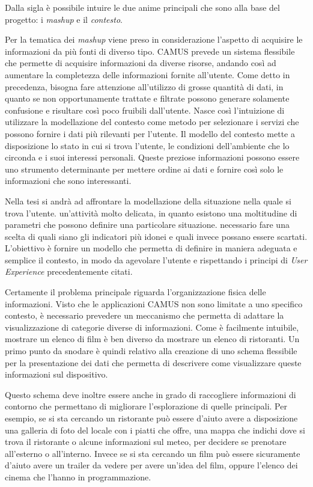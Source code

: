 Dalla sigla è possibile intuire le due anime principali che sono alla base del progetto: i \emph{mashup} e il \emph{contesto}.

Per la tematica dei \emph{mashup} viene preso in considerazione l'aspetto di acquisire le informazioni da più fonti di diverso tipo. CAMUS prevede un sistema flessibile che permette di acquisire informazioni da diverse risorse, andando così ad aumentare la completezza delle informazioni fornite all'utente. Come detto in precedenza, bisogna fare attenzione all'utilizzo di grosse quantità di dati, in quanto se non opportunamente trattate e filtrate possono generare solamente confusione e risultare così poco fruibili dall'utente. Nasce così l'intuizione di utilizzare la modellazione del contesto come metodo per selezionare i servizi che possono fornire i dati più rilevanti per l'utente. Il modello del contesto mette a disposizione lo stato in cui si trova l'utente, le condizioni dell'ambiente che lo circonda e i suoi interessi personali. Queste preziose informazioni possono essere uno strumento determinante per mettere ordine ai dati e fornire così solo le informazioni che sono interessanti.

Nella tesi si andrà ad affrontare la modellazione della situazione nella quale si trova l'utente. \upe un'attività molto delicata, in quanto esistono una moltitudine di parametri che possono definire una particolare situazione. \upe necessario fare una scelta di quali siano gli indicatori più idonei e quali invece possano essere scartati. L'obiettivo è fornire un modello che permetta di definire in maniera adeguata e semplice il contesto, in modo da agevolare l'utente e rispettando i principi di \emph{User Experience} precedentemente citati.

Certamente il problema principale riguarda l'organizzazione fisica delle informazioni. Visto che le applicazioni CAMUS non sono limitate a uno specifico contesto, è necessario prevedere un meccanismo che permetta di adattare la visualizzazione di categorie diverse di informazioni. Come è facilmente intuibile, mostrare un elenco di film è ben diverso da mostrare un elenco di ristoranti. Un primo punto da snodare è quindi relativo alla creazione di uno schema flessibile per la presentazione dei dati che permetta di descrivere come visualizzare queste informazioni sul dispositivo.

Questo schema deve inoltre essere anche in grado di raccogliere informazioni di contorno che permettano di migliorare l'esplorazione di quelle principali. Per esempio, se si sta cercando un ristorante può essere d'aiuto avere a disposizione una galleria di foto del locale con i piatti che offre, una mappa che indichi dove si trova il ristorante o alcune informazioni sul meteo, per decidere se prenotare all'esterno o all'interno. Invece se si sta cercando un film può essere sicuramente d'aiuto avere un trailer da vedere per avere un'idea del film, oppure l'elenco dei cinema che l'hanno in programmazione.

